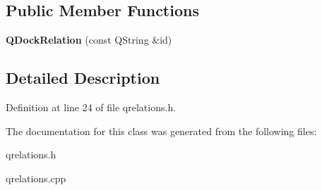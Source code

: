\subsection*{Public Member Functions}
\begin{DoxyCompactItemize}
\item 
\mbox{\label{class_q_dock_relation_a3cef55579cbcd3a665253b62876f69dc}} 
{\bfseries Q\+Dock\+Relation} (const Q\+String \&id)
\end{DoxyCompactItemize}


\subsection{Detailed Description}


Definition at line 24 of file qrelations.\+h.



The documentation for this class was generated from the following files\+:\begin{DoxyCompactItemize}
\item 
qrelations.\+h\item 
qrelations.\+cpp\end{DoxyCompactItemize}
